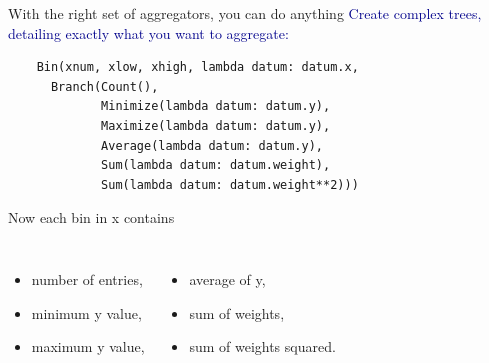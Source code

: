 \documentclass[aspectratio=169]{beamer}
\begin{document}
\begin{frame}[fragile]{With the right set of aggregators, you can do anything}
\vspace{0.75 cm}
\small
\textcolor{darkblue}{\normalsize Create complex trees, detailing exactly what you want to aggregate:}
\begin{verbatim}
    Bin(xnum, xlow, xhigh, lambda datum: datum.x,
      Branch(Count(),
             Minimize(lambda datum: datum.y),
             Maximize(lambda datum: datum.y),
             Average(lambda datum: datum.y),
             Sum(lambda datum: datum.weight),
             Sum(lambda datum: datum.weight**2)))
\end{verbatim}

\vspace{0.25 cm}
\begin{center}
\begin{minipage}{0.8\linewidth}
Now each bin in {\ttfamily\small x} contains
\begin{columns}
\begin{itemize}
\item number of entries,
\item minimum {\ttfamily\small y} value,
\item maximum {\ttfamily\small y} value,
\end{itemize}

\begin{itemize}
\item average of {\ttfamily\small y},
\item sum of weights,
\item sum of weights squared.
\end{itemize}
\end{columns}

\end{minipage}
\end{center}
\end{frame}
\end{document}
